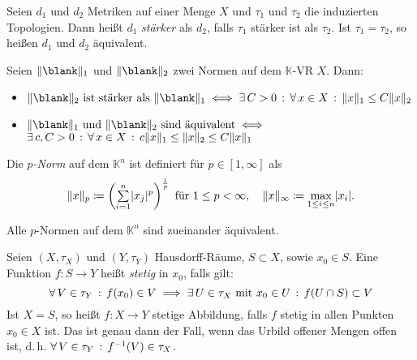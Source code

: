 \documentclass{cheat-sheet}
\newcommand{\K}{\mathbb{K}}
\begin{document}
\begin{defn}
  Seien $d_1$ und $d_2$ Metriken auf einer Menge $X$ und $\tau_1$ und $\tau_2$ die induzierten Topologien. Dann heißt $d_1$ \emph{stärker} als $d_2$, falls $\tau_1$ stärker ist als $\tau_2$. Ist $\tau_1 = \tau_2$, so heißen $d_1$ und $d_2$ äquivalent.
\end{defn}


\begin{satz}
  Seien $\norm{\blank}_1$ und $\norm{\blank}_2$ zwei Normen auf dem $\K$-VR $X$. Dann:
  \begin{itemize}
    \item $\norm{\blank}_2 \text{ ist stärker als } \norm{\blank}_1 \iff \ex{C > 0} \fa{x \in X} \norm{x}_1 \leq C \norm{x}_2$
    \item $\norm{\blank}_1 \text{ und } \norm{\blank}_2 \text{ sind äquivalent} \iff $\\
    $\exists \, {c, C > 0} \,:\, \forall \, {x \in X} \,:\, c \lVert x\rVert_1 \leq \lVert x\rVert_2 \leq C \lVert x\rVert_1$
  \end{itemize}
\end{satz}

\begin{defn}
  Die \emph{$p$-Norm} auf dem $\K^n$ ist definiert für $p \in \left[ 1, \infty \right]$ als
  \[
    \norm{x}_p \coloneqq \left( \sum_{i = 1}^n \abs{x_j}^p \right)^{\frac{1}{p}} \text{ für } 1 \leq p < \infty, \quad
    \norm{x}_{\infty} \coloneqq \max_{1 \leq i \leq n} \abs{x_i}.
  \]
\end{defn}

\begin{bem}
  Alle $p$-Normen auf dem $\K^n$ sind zueinander äquivalent.
\end{bem}



\begin{defn}
  Seien $(X, \tau_X)$ und $(Y, \tau_Y)$ Hausdorff-Räume, $S \subset X$, sowie $x_0 \in S$. Eine Funktion $f : S \to Y$ heißt \emph{stetig} in $x_0$, falls gilt:
  \[ \forall \, {V \in \tau_Y} \,:\, f(x_0) \in V \implies \exists \, {U \in \tau_X \text{ mit } x_0 \in U} \,:\, f(U \cap S) \subset V \]
  Ist $X = S$, so heißt $f : X \to Y$ stetige Abbildung, falls $f$ stetig in allen Punkten $x_0 \in X$ ist. Das ist genau dann der Fall, wenn das Urbild offener Mengen offen ist, d.\,h. $\forall \, {V \in \tau_Y} \,:\, f^{-1}(V) \in \tau_X$.
\end{defn}
\end{document}
